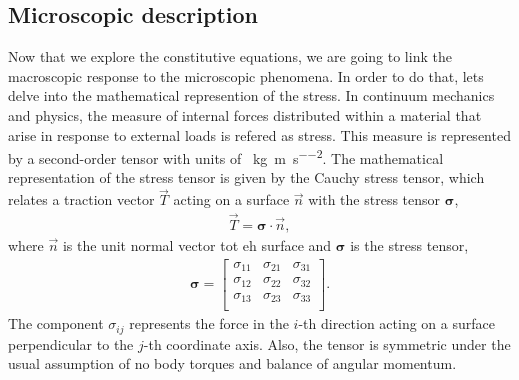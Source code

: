 \subsection{Microscopic description}

Now that we explore the constitutive equations, we are going to link the macroscopic response to the microscopic phenomena.
In order to do that, lets delve into the mathematical represention of the stress.
In continuum mechanics and physics, the measure of internal forces distributed within a material that arise in response to external loads is refered as stress.
This measure is represented by a second-order tensor with units of \SI{}{\kilo\gram\per\meter\per\second\squared}.
The mathematical representation of the stress tensor is given by the Cauchy stress tensor, which relates a traction vector $\vec{T}$ acting on a surface $\vec{n}$ with the stress tensor $\bm{\sigma}$, %
\begin{gather}
    \vec{T} = \bm{\sigma}\cdot\vec{n},\label{eqn:tractionVector}
\end{gather}
where $\vec{n}$ is the unit normal vector tot eh surface and $\bm{\sigma}$ is the stress tensor,
\begin{gather*}
    \bm{\sigma} = 
    \begin{bmatrix}
        \sigma_{11} & \sigma_{21} & \sigma_{31} \\
        \sigma_{12} & \sigma_{22} & \sigma_{32} \\
        \sigma_{13} & \sigma_{23} & \sigma_{33} \\
    \end{bmatrix}.\label{eqn:stressTensor}
\end{gather*}
The component $\sigma_{ij}$ represents the force in the $i$-th direction acting on a surface perpendicular to the $j$-th coordinate axis.
Also, the tensor is symmetric under the usual assumption of no body torques and balance of angular momentum.
